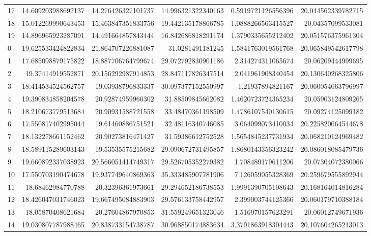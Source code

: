 \begin{tabular}{lrrrrr}
17 & 14.609203988692137 & 14.276426327101737 & 14.996321322340163 & 0.5919721126556396 & 20.044562339782715 \\
18 & 15.012269990643453 & 15.463847351833756 & 19.442135178866785 & 1.0888266563415527 & 20.04357099533081 \\
19 & 14.896965923287091 & 14.491664857843444 & 16.842686818291174 & 1.3790335655212402 & 20.051576375961304 \\
0 & 19.625533424822834 & 21.864707226881087 & 31.0281491181245 & 1.5841763019561768 & 20.065849542617798 \\
1 & 17.685098879175822 & 18.887706764799674 & 29.072792830901186 & 2.314274311065674 & 20.06209444999695 \\
2 & 19.37414919552871 & 20.156292987914853 & 28.847117826347514 & 2.041961908340454 & 20.130640268325806 \\
3 & 18.414534524562757 & 19.03938796833337 & 30.097377152550997 & 1.21937894821167 & 20.060054063796997 \\
4 & 19.390834858204578 & 20.92874959960302 & 31.88509845662082 & 1.4620723724365234 & 20.05903124809265 \\
5 & 18.210673779513684 & 20.90931588721558 & 33.48470361198509 & 1.4786107540130615 & 20.09274125099182 \\
6 & 17.550817402995044 & 19.61460886751521 & 32.48116340746085 & 3.064099073410034 & 20.225820064544678 \\
7 & 18.132278661152462 & 20.90273816471427 & 31.59386612752528 & 1.5654845237731934 & 20.068210124969482 \\
8 & 18.589115289603143 & 19.53535575215682 & 29.090672731495857 & 1.8680143356323242 & 20.086018085479736 \\
9 & 19.660892337038923 & 20.566051414749317 & 29.526705352279382 & 1.708489179611206 & 20.07304072380066 \\
10 & 17.550703190474678 & 19.937749640869363 & 35.333485907781906 & 7.126059055328369 & 20.259679555892944 \\
11 & 18.68462984770788 & 20.32396361973661 & 29.294652186738553 & 1.9991390705108643 & 20.168164014816284 \\
12 & 18.426047031746023 & 19.667495084883903 & 29.576133758442957 & 2.399003744125366 & 20.060179710388184 \\
13 & 18.05870408621684 & 20.27604867970853 & 31.559249651323046 & 1.516970157623291 & 20.06012749671936 \\
14 & 19.030807787988465 & 20.838733154738787 & 30.968850174883634 & 3.3791863918304443 & 20.107604265213013 \\

\end{tabular}
